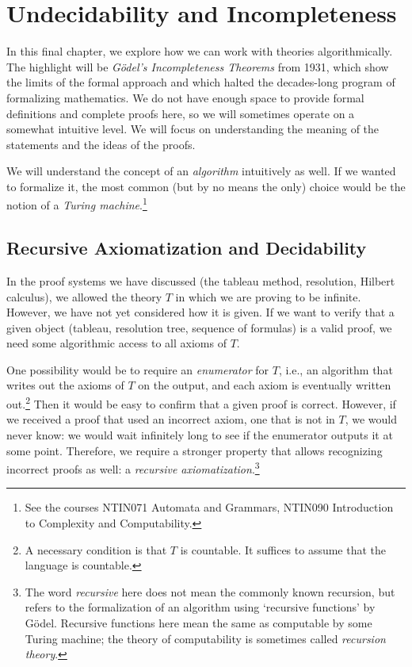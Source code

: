 \chapter{Undecidability and Incompleteness}

In this final chapter, we explore how we can work with theories algorithmically. The highlight will be \emph{Gödel's Incompleteness Theorems} from 1931, which show the limits of the formal approach and which halted the decades-long program of formalizing mathematics. We do not have enough space to provide formal definitions and complete proofs here, so we will sometimes operate on a somewhat intuitive level. We will focus on understanding the meaning of the statements and the ideas of the proofs.

We will understand the concept of an \emph{algorithm} intuitively as well. If we wanted to formalize it, the most common (but by no means the only) choice would be the notion of a \emph{Turing machine}.\footnote{See the courses NTIN071 Automata and Grammars, NTIN090 Introduction to Complexity and Computability.}

\section{Recursive Axiomatization and Decidability}

In the proof systems we have discussed (the tableau method, resolution, Hilbert calculus), we allowed the theory $T$ in which we are proving to be infinite. However, we have not yet considered how it is given. If we want to verify that a given object (tableau, resolution tree, sequence of formulas) is a valid proof, we need some algorithmic access to all axioms of $T$.

One possibility would be to require an \emph{enumerator} for $T$, i.e., an algorithm that writes out the axioms of $T$ on the output, and each axiom is eventually written out.\footnote{A necessary condition is that $T$ is countable. It suffices to assume that the language is countable.} Then it would be easy to confirm that a given proof is correct. However, if we received a proof that used an incorrect axiom, one that is not in $T$, we would never know: we would wait infinitely long to see if the enumerator outputs it at some point. Therefore, we require a stronger property that allows recognizing incorrect proofs as well: a \emph{recursive axiomatization}.\footnote{The word \emph{recursive} here does not mean the commonly known recursion, but refers to the formalization of an algorithm using `recursive functions' by Gödel. Recursive functions here mean the same as computable by some Turing machine; the theory of computability is sometimes called \emph{recursion theory}.}


